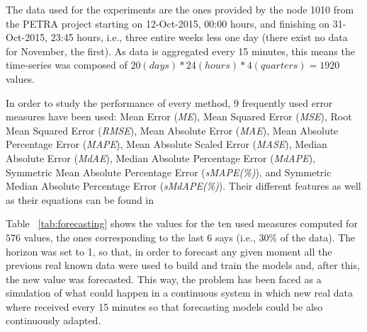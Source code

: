 The data used for the experiments are the ones provided by the node 1010 from the PETRA project starting on 12-Oct-2015, 00:00 hours, and finishing on 31-Oct-2015, 23:45 hours, i.e., three entire weeks less one day (there exist no data for November, the first). As data is aggregated every 15 minutes, this means the time-series was composed of $20(days)*24(hours)*4(quarters)=1920$ values.

In order to study the performance of every method, 9 frequently used error measures have been used:
Mean Error ({\em ME}),
 Mean Squared Error ({\em MSE}),
 Root Mean Squared Error ({\em RMSE}),
 Mean Absolute Error ({\em MAE}),
 Mean Absolute Percentage Error ({\em MAPE}),
 Mean Absolute Scaled Error ({\em MASE}),
 Median Absolute Error ({\em MdAE}),
 Median Absolute Percentage Error ({\em MdAPE}),
 Symmetric Mean Absolute Percentage Error ({\em sMAPE(\%)}), and
 Symmetric Median Absolute Percentage Error ({\em sMdAPE(\%)}).
Their different features as well as their equations can be found in ~\cite{RePEc:eee:intfor:v:22:y:2006:i:4:p:679-688}

Table ~\ref{tab:forecasting} shows the values for the ten used measures computed for $576$ values, the ones corresponding to the last 6 says (i.e., $30\%$ of the data). The horizon was set to 1, so that, in order to forecast any given moment all the previous real known data were used to build and train the models and, after this, the new value was forecasted. This way, the problem has been faced as a simulation of what could happen in a continuous system in which new real data where received every 15 minutes so that forecasting models could be also continuously adapted.

